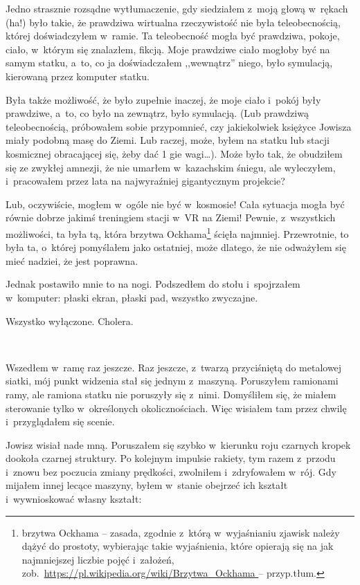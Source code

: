 \documentclass[oneside,polish,11pt,sfheadings]{mwbk}
\begin{document}
Jedno strasznie rozsądne wytłumaczenie, gdy siedziałem z~moją głową w~rękach (ha!) było takie, że prawdziwa wirtualna rzeczywistość nie była
teleobecnością, której doświadczyłem w~ramie. Ta teleobecność mogła być
prawdziwa, pokoje, ciało, w~którym się znalazłem, fikcją. Moje prawdziwe
ciało mogłoby być na samym statku, a~to, co ja doświadczałem ,,wewnątrz''
niego, było symulacją, kierowaną przez komputer statku.

Była także możliwość, że było zupełnie inaczej, że moje ciało i~pokój
były prawdziwe, a~to, co było na zewnątrz, było symulacją. (Lub
prawdziwą teleobecnością, próbowałem sobie przypomnieć, czy jakiekolwiek
księżyce Jowisza miały podobną masę do Ziemi. Lub raczej, może, byłem na
statku lub stacji kosmicznej obracającej się, żeby dać 1 gie wagi\ldots).
Może było tak, że obudziłem się ze zwykłej amnezji, że nie umarłem w~kazachskim śniegu, ale wyleczyłem, i~pracowałem przez lata na
najwyraźniej gigantycznym projekcie?

Lub, oczywiście, mogłem w~ogóle nie być w~kosmosie! Cała sytuacja mogła
być równie dobrze jakimś treningiem stacji w~VR na Ziemi! Pewnie, z~wszystkich możliwości, ta była tą, która brzytwa Ockhama\footnote{brzytwa
Ockhama -- zasada, zgodnie z~którą w~wyjaśnianiu zjawisk należy dążyć do
prostoty, wybierając takie wyjaśnienia, które opierają się na jak
najmniejszej liczbie pojęć i~założeń,
zob.~\url{https://pl.wikipedia.org/wiki/Brzytwa_Ockhama } -- przyp.tłum. } ścięła najmniej. Przewrotnie, to była ta, o~której
pomyślałem jako ostatniej, może dlatego, że nie odważyłem się mieć
nadziei, że jest poprawna.

Jednak postawiło mnie to na nogi. Podszedłem do stołu i~spojrzałem w~komputer: płaski ekran, płaski pad, wszystko zwyczajne.

Wszystko wyłączone. Cholera.

~

Wszedłem w~ramę raz jeszcze. Raz jeszcze, z~twarzą przyciśniętą do
metalowej siatki, mój punkt widzenia stał się jednym z~maszyną.
Poruszyłem ramionami ramy, ale ramiona statku nie poruszyły się z~nimi.
Domyśliłem się, że miałem sterowanie tylko w~określonych
okolicznościach. Więc wisiałem tam przez chwilę i~przyglądałem się
scenie.

Jowisz wisiał nade mną. Poruszałem się szybko w~kierunku roju czarnych
kropek dookoła czarnej struktury. Po kolejnym impulsie rakiety, tym
razem z~przodu i~znowu bez poczucia zmiany prędkości, zwolniłem i~zdryfowałem w~rój. Gdy mijałem innej lecące maszyny, byłem w~stanie
obejrzeć ich kształt i~wywnioskować własny kształt:
\end{document}

